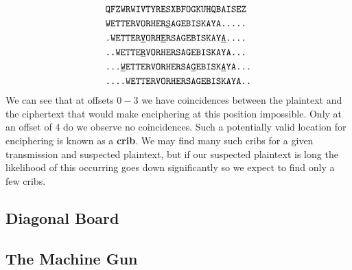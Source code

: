 \begin{align*}
	 & \texttt{QFZWRWIVTYRESXBFOGKUHQBAISEZ}                                                                                      \\
	 & \texttt{WETTERVORHER}{\uline{\texttt{S}}}\texttt{AGEBISKAYA.....}                                                          \\
	 & \texttt{.WETTER}{\uline{\texttt{V}}}\texttt{ORH}{\uline{\texttt{E}}}\texttt{RSAGEBISKAY}{\uline{\texttt{A}}}\texttt{....}  \\
	 & \texttt{..WETTE}{\uline{\texttt{R}}}\texttt{VORHERSAGEBISKAYA...}                                                          \\
	 & \texttt{...}{\uline{\texttt{W}}}\texttt{ETTERVORHERSA}{\uline{\texttt{G}}}\texttt{EBISK}{\uline{\texttt{A}}}\texttt{YA...} \\
	 & \texttt{....WETTERVORHERSAGEBISKAYA..}                                                                                     \\
\end{align*}
We can see that at offsets $0-3$ we have coincidences between the plaintext and the ciphertext that would make enciphering at this position impossible. Only at an offset of $4$ do we observe no coincidences. Such a potentially valid location for enciphering is known as a {\bf{crib}}. We may find many such cribs for a given transmission and suspected plaintext, but if our suspected plaintext is long the likelihood of this occurring goes down significantly so we expect to find only a few cribs.


\subsection{Diagonal Board}

\subsection{The Machine Gun}
